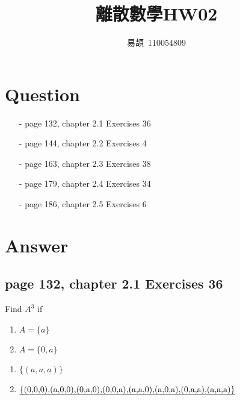 \documentclass[sigconf]{acmart}
\begin{document}
\title{離散數學HW02}

\author{易頡~110054809}
\orcid{}

\maketitle

\section{Question}
\begin{itemize}
	\item[-] page 132, chapter 2.1 Exercises 36
	\item[-] page 144, chapter 2.2 Exercises 4
	\item[-] page 163, chapter 2.3 Exercises 38
	\item[-] page 179, chapter 2.4 Exercises 34
	\item[-] page 186, chapter 2.5 Exercises 6
\end{itemize}

\section{Answer}
\subsection{page 132, chapter 2.1 Exercises 36}
\begin{shaded}
    Find $A^3$ if
    \begin{enumerate}[label=(\alph*)]
    	\item $A = \{a\}$
    	\item $A = \{0, a\}$
    \end{enumerate}
\end{shaded}  
\begin{enumerate}[label=(\alph*)]
	\item $\{(a, a, a)\}$
	\item $\text{\uline{\{(0,0,0),(a,0,0),(0,a,0),(0,0,a),(a,a,0),(a,0,a),(0,a,a),(a,a,a)\}}}$
\end{enumerate}
\end{document}
